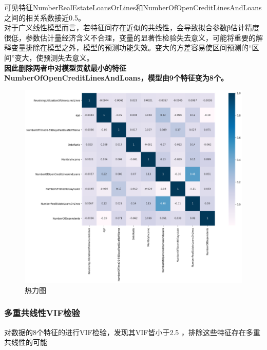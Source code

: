 \documentclass[12pt]{article}
\begin{document}
\begin{flushleft}
	\noindent\qquad 可见特征NumberRealEstateLoansOrLines和NumberOfOpenCreditLinesAndLoans之间的相关系数接近0.5。\\
	\noindent\qquad 对于广义线性模型而言，若特征间存在近似的共线性，会导致拟合参数β估计精度很低，参数估计量经济含义不合理，变量的显著性检验失去意义，可能将重要的解释变量排除在模型之外，模型的预测功能失效。变大的方差容易使区间预测的“区间”变大，使预测失去意义。\\
	\noindent\qquad \textbf{因此删除两者中对模型贡献最小的特征NumberOfOpenCreditLinesAndLoans，模型由9个特征变为8个。}
	
\end{flushleft}
\vspace{1.5cm}
\begin{figure}[H]
	\centering
	\includegraphics[width=1\linewidth]{figures/screenshot008}
	\caption{热力图}
\end{figure}
\newpage
\subsubsection{多重共线性VIF检验}

\begin{flushleft}
	\noindent\qquad 对数据的8个特征的进行VIF检验，发现其VIF皆小于2.5 ，排除这些特征存在多重共线性的可能
\end{flushleft}
\end{document}
